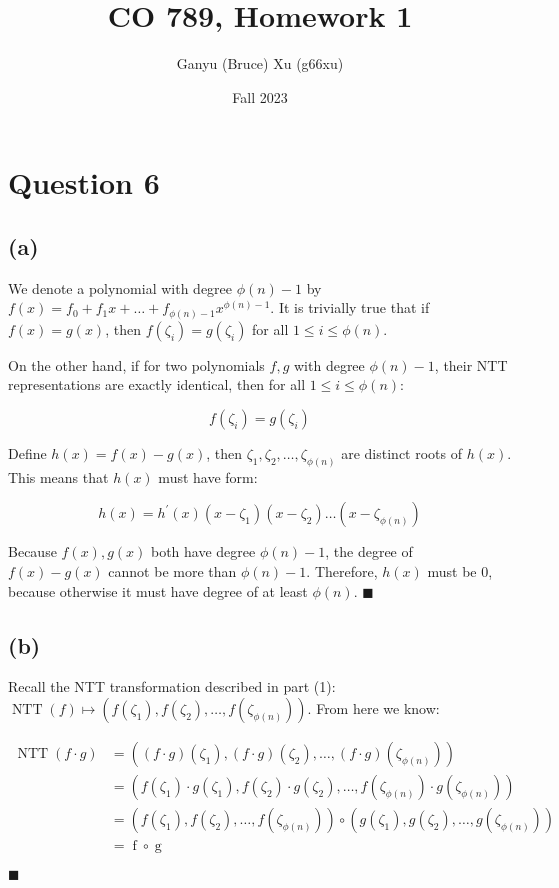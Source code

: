 \documentclass{article}
\title{CO 789, Homework 1}
\author{Ganyu (Bruce) Xu (g66xu)}
\date{Fall 2023}
\begin{document}

\section*{Question 6}
\subsection*{(a)}
We denote a polynomial with degree $\phi(n) - 1$ by $f(x) = f_0 + f_1x + \ldots + f_{\phi(n)-1}x^{\phi(n)-1}$. It is trivially true that if $f(x) = g(x)$, then $f(\zeta_i) = g(\zeta_i)$ for all $1 \leq i \leq \phi(n)$.

On the other hand, if for two polynomials $f, g$ with degree $\phi(n) - 1$, their NTT representations are exactly identical, then for all $1 \leq i \leq \phi(n)$:

$$
f(\zeta_i) = g(\zeta_i)
$$

Define $h(x) = f(x) - g(x)$, then $\zeta_1, \zeta_2, \ldots, \zeta_{\phi(n)}$ are distinct roots of $h(x)$. This means that $h(x)$ must have form:

$$
h(x) = h^\prime(x)(x - \zeta_1)(x - \zeta_2) \ldots (x - \zeta_{\phi(n)})
$$

Because $f(x), g(x)$ both have degree $\phi(n) - 1$, the degree of $f(x) - g(x)$ cannot be more than $\phi(n) - 1$. Therefore, $h(x)$ must be $0$, because otherwise it must have degree of at least $\phi(n)$. $\blacksquare$

\subsection*{(b)}
Recall the NTT transformation described in part (1): $\operatorname{NTT}(f) \mapsto (f(\zeta_1), f(\zeta_2), \ldots, f(\zeta_{\phi(n)}))$. From here we know:

$$
\begin{aligned}
\operatorname{NTT}(f \cdot g) 
&= ((f \cdot g)(\zeta_1), (f \cdot g)(\zeta_2), \ldots, (f \cdot g)(\zeta_{\phi(n)})) \\
&= (f(\zeta_1) \cdot g(\zeta_1), f(\zeta_2) \cdot g(\zeta_2), \ldots, f(\zeta_{\phi(n)}) \cdot g(\zeta_{\phi(n)})) \\
&= (f(\zeta_1), f(\zeta_2), \ldots, f(\zeta_{\phi(n)})) \circ (g(\zeta_1), g(\zeta_2), \ldots, g(\zeta_{\phi(n)})) \\
&= \operatorname{f} \circ \operatorname{g}
\end{aligned}
$$

$\blacksquare$
\end{document}
